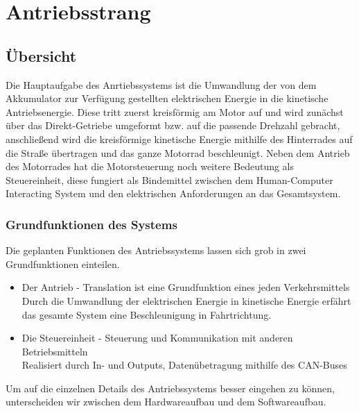 \chapter{Antriebsstrang}


\section{Übersicht}
Die Hauptaufgabe des Anrtiebssystems ist die Umwandlung der von dem Akkumulator zur Verfügung gestellten elektrischen Energie in die kinetische Antriebsenergie. Diese tritt zuerst kreisförmig am Motor auf und wird zunächst über das Direkt-Getriebe umgeformt bzw. auf die passende Drehzahl gebracht, anschließend wird die kreisförmige kinetische Energie mithilfe des Hinterrades auf die Straße übertragen und das ganze Motorrad beschleunigt. Neben dem Antrieb des Motorrades hat die Motorsteuerung noch weitere Bedeutung als Steuereinheit, diese fungiert als Bindemittel zwischen dem Human-Computer Interacting System und den elektrischen Anforderungen an das Gesamtsystem.


\subsection{Grundfunktionen des Systems}
Die geplanten Funktionen des Antriebssystems lassen sich grob in zwei Grundfunktionen einteilen.

\begin{itemize}
	\item Der Antrieb - Translation ist eine Grundfunktion eines jeden Verkehrsmittels
	\\ Durch die Umwandlung der elektrischen Energie in kinetische Energie erfährt 
	\\ das gesamte System eine Beschleunigung in Fahrtrichtung.
	\item Die Steuereinheit - Steuerung und Kommunikation mit anderen Betriebsmitteln
	\\ Realisiert durch In- und Outputs, Datenübetragung mithilfe des CAN-Buses 
\end{itemize}

Um auf die einzelnen Details des Antriebssystems besser eingehen zu können, unterscheiden wir zwischen dem Hardwareaufbau und dem Softwareaufbau.

\newpage



